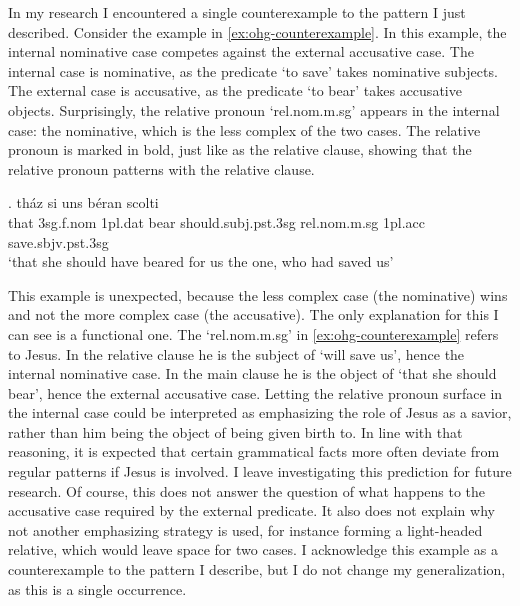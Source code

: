 In my research I encountered a single counterexample to the pattern I just described.
Consider the example in \ref{ex:ohg-counterexample}. In this example, the internal nominative case competes against the external accusative case.
The internal case is nominative, as the predicate  `to save' takes nominative subjects.
The external case is accusative, as the predicate  `to bear' takes accusative objects.
Surprisingly, the relative pronoun  `\ac{rel}.\ac{nom}.\ac{m}.\ac{sg}' appears in the internal case: the nominative, which is the less complex of the two cases. The relative pronoun is marked in bold, just like as the relative clause, showing that the relative pronoun patterns with the relative clause.

\exg. tház si uns béran scolti   \\
 that 3\ac{sg}.\ac{f}.\ac{nom} 1\ac{pl}.\ac{dat} bear\scsub{[acc]} should.\ac{subj}.\ac{pst}.3\ac{sg} \ac{rel}.\ac{nom}.\ac{m}.\ac{sg} 1\ac{pl}.\ac{acc} save.\ac{sbjv}.\ac{pst}.3\ac{sg}\scsub{[nom]}\\
 `that she should have beared for us the one, who had saved us' \label{ex:ohg-counterexample}

This example is unexpected, because the less complex case (the nominative) wins and not the more complex case (the accusative).
The only explanation for this I can see is a functional one. The  `\ac{rel}.\ac{nom}.\ac{m}.\ac{sg}' in \ref{ex:ohg-counterexample} refers to Jesus. In the relative clause he is the subject of  `will save us', hence the internal nominative case. In the main clause he is the object of  `that she should bear', hence the external accusative case.
Letting the relative pronoun surface in the internal case could be interpreted as emphasizing the role of Jesus as a savior, rather than him being the object of being given birth to. In line with that reasoning, it is expected that certain grammatical facts more often deviate from regular patterns if Jesus is involved. I leave investigating this prediction for future research.
Of course, this does not answer the question of what happens to the accusative case required by the external predicate. It also does not explain why not another emphasizing strategy is used, for instance forming a light-headed relative, which would leave space for two cases.
I acknowledge this example as a counterexample to the pattern I describe, but I do not change my generalization, as this is a single occurrence.

